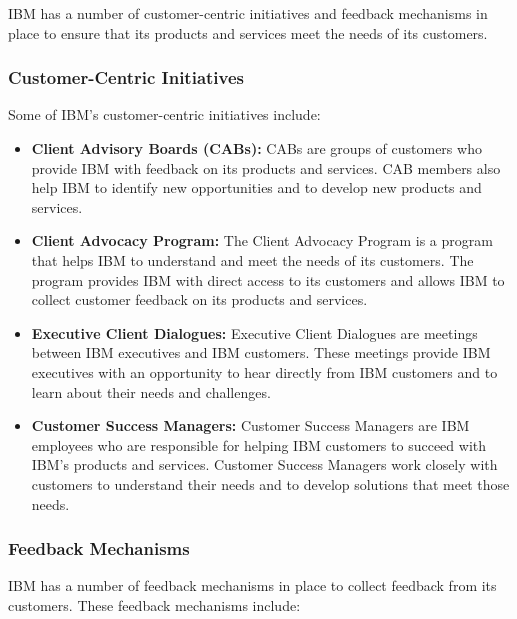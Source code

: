 IBM has a number of customer-centric initiatives and feedback mechanisms in place to ensure that its products and services meet the needs of its customers.

\subsubsection{Customer-Centric Initiatives}

Some of IBM's customer-centric initiatives include:

\begin{itemize}
  \item \textbf{Client Advisory Boards (CABs):} CABs are groups of customers who provide IBM with feedback on its products and services. CAB members also help IBM to identify new opportunities and to develop new products and services.
  
  \item \textbf{Client Advocacy Program:} The Client Advocacy Program is a program that helps IBM to understand and meet the needs of its customers. The program provides IBM with direct access to its customers and allows IBM to collect customer feedback on its products and services.
  
  \item \textbf{Executive Client Dialogues:} Executive Client Dialogues are meetings between IBM executives and IBM customers. These meetings provide IBM executives with an opportunity to hear directly from IBM customers and to learn about their needs and challenges.
  
  \item \textbf{Customer Success Managers:} Customer Success Managers are IBM employees who are responsible for helping IBM customers to succeed with IBM's products and services. Customer Success Managers work closely with customers to understand their needs and to develop solutions that meet those needs.
\end{itemize}

\subsubsection{Feedback Mechanisms}

IBM has a number of feedback mechanisms in place to collect feedback from its customers. These feedback mechanisms include:

